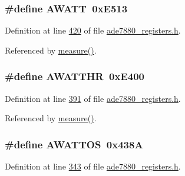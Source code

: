 \hypertarget{a00036_a70d4c8c1577490f1b69cfab591458142}{
\subsubsection[{A\-W\-A\-T\-T}]{\setlength{\rightskip}{0pt plus 5cm}\#define A\-W\-A\-T\-T~0x\-E513}}\label{de/d8c/a00036_a70d4c8c1577490f1b69cfab591458142}


Definition at line \hyperlink{a00036_source_l00420}{420} of file \hyperlink{a00036_source}{ade7880\-\_\-registers.\-h}.



Referenced by \hyperlink{a00042_source_l00040}{measure()}.

\hypertarget{a00036_ae66c97ed86f47fd938f143a30a8b2f7e}{
\subsubsection[{A\-W\-A\-T\-T\-H\-R}]{\setlength{\rightskip}{0pt plus 5cm}\#define A\-W\-A\-T\-T\-H\-R~0x\-E400}}\label{de/d8c/a00036_ae66c97ed86f47fd938f143a30a8b2f7e}


Definition at line \hyperlink{a00036_source_l00391}{391} of file \hyperlink{a00036_source}{ade7880\-\_\-registers.\-h}.



Referenced by \hyperlink{a00042_source_l00040}{measure()}.

\hypertarget{a00036_a473d84b2550fdf5e0c68a8f27e1a3c53}{
\subsubsection[{A\-W\-A\-T\-T\-O\-S}]{\setlength{\rightskip}{0pt plus 5cm}\#define A\-W\-A\-T\-T\-O\-S~0x438\-A}}\label{de/d8c/a00036_a473d84b2550fdf5e0c68a8f27e1a3c53}


Definition at line \hyperlink{a00036_source_l00343}{343} of file \hyperlink{a00036_source}{ade7880\-\_\-registers.\-h}.

